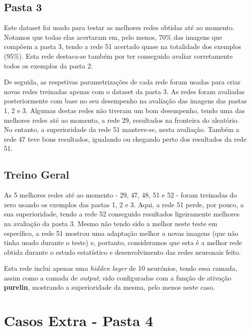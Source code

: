 \documentclass[11pt]{article}
\begin{document}
	\pagebreak
	
	\large
	\subsection{Pasta 3}
	\normalsize
	
	Este dataset foi usado para testar as melhores redes obtidas até ao momento. Notamos que todas elas acertaram em, pelo menos, 70\% das imagens que compõem a pasta 3, tendo a rede 51 acertado quase na totalidade dos exemplos (95\%). Esta rede destaca-se também por ter conseguido avaliar corretamente todos os exemplos da pasta 2.
	
	De seguida, as respetivas parametrizações de cada rede foram usadas para criar novas redes treinadas apenas com o dataset da pasta 3. As redes foram avaliadas posteriormente com base no seu desempenho na avaliação das imagens das pastas 1, 2 e 3. Algumas destas redes não tiveram um bom desempenho, tendo uma das melhores redes até ao momento, a rede 29, resultados na fronteira do aleatório. No entanto, a superioridade da rede 51 manteve-se, nesta avaliação. Também a rede 47 teve bons resultados, igualando ou chegando perto dos resultados da rede 51.
	
	\large
	\subsection{Treino Geral}
	\normalsize
	
	As 5 melhores redes até ao momento - 29, 47, 48, 51 e 52 - foram treinadas do zero usando os exemplos das pastas 1, 2 e 3. Aqui, a rede 51 perde, por pouco, a sua superioridade, tendo a rede 52 conseguido resultados ligeiramente melhores na avaliação da pasta 3. Mesmo não tendo sido a melhor neste teste em específico, a rede 51 mostrou uma adaptação melhor a novas imagens (que não tinha usado durante o teste) e, portanto, consideramos que esta é a melhor rede obtida durante o estudo estatístico e desenvolvimento das redes neuronais feito. 
	
	Esta rede inclui apenas uma \textit{hidden layer} de 10 neurónios, tendo essa camada, assim como a camada de \textit{output}, sido configuradas com a função de ativação \textbf{purelin}, mostrando a superioridade da mesma, pelo menos neste caso.
	
	\large
	\section{Casos Extra - Pasta 4}
	\normalsize
	
\end{document}
